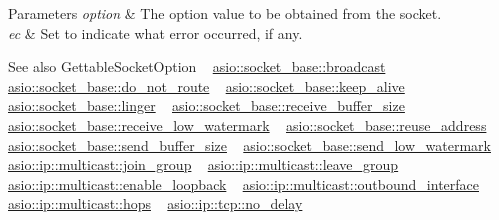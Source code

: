 \begin{DoxyParams}{Parameters}
{\em option} & The option value to be obtained from the socket.\\
\hline
{\em ec} & Set to indicate what error occurred, if any.\\
\hline
\end{DoxyParams}
\begin{DoxySeeAlso}{See also}
Gettable\+Socket\+Option ~\newline
\hyperlink{classasio_1_1socket__base_adb7828bb32a8912680906a66a6551ec3}{asio\+::socket\+\_\+base\+::broadcast} ~\newline
\hyperlink{classasio_1_1socket__base_ab7b1853c3ab069c31202a5ea11deb882}{asio\+::socket\+\_\+base\+::do\+\_\+not\+\_\+route} ~\newline
\hyperlink{classasio_1_1socket__base_a18672db1f78d0e0e58899e90100bf688}{asio\+::socket\+\_\+base\+::keep\+\_\+alive} ~\newline
\hyperlink{classasio_1_1socket__base_a0c1a9362331c7574dbf3ec48d2491c34}{asio\+::socket\+\_\+base\+::linger} ~\newline
\hyperlink{classasio_1_1socket__base_a7d102a034ff7e2a71dfe6434c6ba0525}{asio\+::socket\+\_\+base\+::receive\+\_\+buffer\+\_\+size} ~\newline
\hyperlink{classasio_1_1socket__base_acc8a5f622e3b8345e5aa2c4c733bd0fa}{asio\+::socket\+\_\+base\+::receive\+\_\+low\+\_\+watermark} ~\newline
\hyperlink{classasio_1_1socket__base_a67c5df52b56da13637929727916e4a0a}{asio\+::socket\+\_\+base\+::reuse\+\_\+address} ~\newline
\hyperlink{classasio_1_1socket__base_a0d4a964ee76ec66ae251e903bff872e5}{asio\+::socket\+\_\+base\+::send\+\_\+buffer\+\_\+size} ~\newline
\hyperlink{classasio_1_1socket__base_ac6dce7c293671df85757eeed300d4209}{asio\+::socket\+\_\+base\+::send\+\_\+low\+\_\+watermark} ~\newline
\hyperlink{namespaceasio_1_1ip_1_1multicast_af1296ad63123b3adc414c0bbeb328db3}{asio\+::ip\+::multicast\+::join\+\_\+group} ~\newline
\hyperlink{namespaceasio_1_1ip_1_1multicast_ae0f41e19e723749f6373383e45020844}{asio\+::ip\+::multicast\+::leave\+\_\+group} ~\newline
\hyperlink{namespaceasio_1_1ip_1_1multicast_a6a21cc875fbfac80d2049c95bc7dfe6b}{asio\+::ip\+::multicast\+::enable\+\_\+loopback} ~\newline
\hyperlink{namespaceasio_1_1ip_1_1multicast_a0c7f18a8d8e3922c06d0d3894754b2f5}{asio\+::ip\+::multicast\+::outbound\+\_\+interface} ~\newline
\hyperlink{namespaceasio_1_1ip_1_1multicast_a9fb457c6f8978841b954fc752c04563f}{asio\+::ip\+::multicast\+::hops} ~\newline
\hyperlink{classasio_1_1ip_1_1tcp_a9a35d1c7bb67c0ec1481336cfa826c2e}{asio\+::ip\+::tcp\+::no\+\_\+delay}
\end{DoxySeeAlso}
